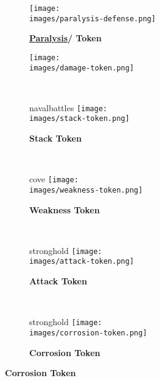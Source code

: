 \vspace*{-1em}
\begin{figure}[H]
  \centering
  \begin{subfigure}[c]{0.17\linewidth}
    \centering
    \texttt{[image: \\images/paralysis-defense.png]}
    \caption{\textbf{\hyperlink{Paralysis}{Paralysis}/  Token}}
  \end{subfigure}
  \begin{subfigure}[c]{0.1\linewidth}
    \centering
    \texttt{[image: \\images/damage-token.png]}
    \caption{\textbf{}}
  \end{subfigure}
  ~
  \begin{subfigure}[c]{0.15\linewidth}
    \begin{expansionmini}{navalbattles}
      \centering
      \vspace{0.5em}
      \texttt{[image: \\images/stack-token.png]}
      \caption{\textbf{Stack Token \phantom{Population}}}
    \end{expansionmini}
  \end{subfigure}
  ~
  \begin{subfigure}[c]{0.15\linewidth}
    \begin{expansionmini}{cove}
      \centering
      \vspace{0.5em}
      \texttt{[image: \\images/weakness-token.png]}
      \caption{\textbf{Weakness Token}}
    \end{expansionmini}
  \end{subfigure}
  ~
  \begin{subfigure}[c]{0.15\linewidth}
    \begin{expansionmini}{stronghold}
      \centering
      \vspace{0.5em}
      \texttt{[image: \\images/attack-token.png]}
      \caption{\textbf{Attack Token}}
    \end{expansionmini}
  \end{subfigure}
  ~
  \begin{subfigure}[c]{0.15\linewidth}
    \begin{expansionmini}{stronghold}
      \centering
      \vspace{0.5em}
      \texttt{[image: \\images/corrosion-token.png]}
      \caption{\textbf{Corrosion Token}}
    \end{expansionmini}
  \end{subfigure}
\end{figure}

